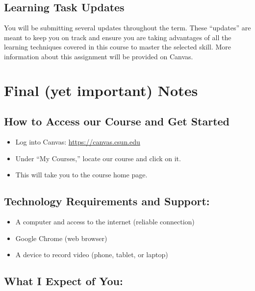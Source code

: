 \documentclass[
  letterpaper,
  DIV=11,
  numbers=noendperiod,
  oneside]{scrartcl}
\providecommand{\tightlist}{%
  \setlength{\itemsep}{0pt}\setlength{\parskip}{0pt}}\usepackage{longtable,booktabs,array}
\begin{document}
\hypertarget{learning-task-updates}{%
\subsection{Learning Task Updates}\label{learning-task-updates}}

You will be submitting several updates throughout the term. These
``updates'' are meant to keep you on track and ensure you are taking
advantages of all the learning techniques covered in this course to
master the selected skill. More information about this assignment will
be provided on Canvas.

\hypertarget{sec-important-notes}{%
\section{Final (yet important) Notes}\label{sec-important-notes}}

\hypertarget{how-to-access-our-course-and-get-started}{%
\subsection{How to Access our Course and Get
Started}\label{how-to-access-our-course-and-get-started}}

\begin{itemize}
\tightlist
\item
  Log into Canvas: \url{https://canvas.csun.edu}
\item
  Under ``My Courses,'' locate our course and click on it.
\item
  This will take you to the course home page.
\end{itemize}

\hypertarget{technology-requirements-and-support}{%
\subsection{Technology Requirements and
Support:}\label{technology-requirements-and-support}}

\begin{itemize}
\tightlist
\item
  A computer and access to the internet (reliable connection)
\item
  Google Chrome (web browser)
\item
  A device to record video (phone, tablet, or laptop)
\end{itemize}

\hypertarget{what-i-expect-of-you}{%
\subsection{What I Expect of You:}\label{what-i-expect-of-you}}
\end{document}
